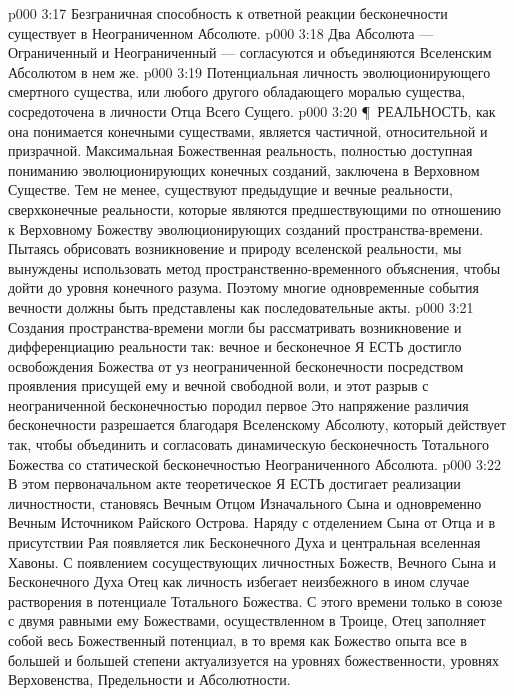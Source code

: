 \vs p000 3:17 \bibnobreakspace Безграничная способность к ответной реакции бесконечности существует в Неограниченном Абсолюте.
\vs p000 3:18 \bibnobreakspace Два Абсолюта --- Ограниченный и Неограниченный --- согласуются и объединяются Вселенским Абсолютом в нем же.
\vs p000 3:19 \bibnobreakspace Потенциальная личность эволюционирующего смертного существа, или любого другого обладающего моралью существа, сосредоточена в личности Отца Всего Сущего.
\vs p000 3:20 \P\ РЕАЛЬНОСТЬ, как она понимается конечными существами, является частичной, относительной и призрачной. Максимальная Божественная реальность, полностью доступная пониманию эволюционирующих конечных созданий, заключена в Верховном Существе. Тем не менее, существуют предыдущие и вечные реальности, сверхконечные реальности, которые являются предшествующими по отношению к Верховному Божеству эволюционирующих созданий пространства\hyp{}времени. Пытаясь обрисовать возникновение и природу вселенской реальности, мы вынуждены использовать метод пространственно\hyp{}временного объяснения, чтобы дойти до уровня конечного разума. Поэтому многие одновременные события вечности должны быть представлены как последовательные акты.
\vs p000 3:21 Создания пространства\hyp{}времени могли бы рассматривать возникновение и дифференциацию реальности так: вечное и бесконечное Я ЕСТЬ достигло освобождения Божества от уз неограниченной бесконечности посредством проявления присущей ему и вечной свободной воли, и этот разрыв с неограниченной бесконечностью породил первое  Это напряжение различия бесконечности разрешается благодаря Вселенскому Абсолюту, который действует так, чтобы объединить и согласовать динамическую бесконечность Тотального Божества со статической бесконечностью Неограниченного Абсолюта.
\vs p000 3:22 В этом первоначальном акте теоретическое Я ЕСТЬ достигает реализации личностности, становясь Вечным Отцом Изначального Сына и одновременно Вечным Источником Райского Острова. Наряду с отделением Сына от Отца и в присутствии Рая появляется лик Бесконечного Духа и центральная вселенная Хавоны. С появлением сосуществующих личностных Божеств, Вечного Сына и Бесконечного Духа Отец как личность избегает неизбежного в ином случае растворения в потенциале Тотального Божества. С этого времени только в союзе с двумя равными ему Божествами, осуществленном в Троице, Отец заполняет собой весь Божественный потенциал, в то время как Божество опыта все в большей и большей степени актуализуется на уровнях божественности, уровнях Верховенства, Предельности и Абсолютности.
